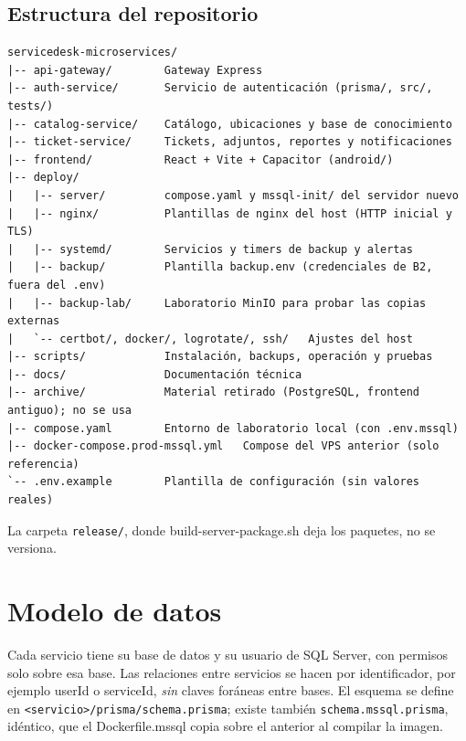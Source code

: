 \documentclass[11pt,a4paper,oneside]{report}
\newcommand{\codus}{\textunderscore\allowbreak}
\DeclareRobustCommand{\cod}[1]{{\small\ttfamily\let\_\codus #1}}
\DeclareRobustCommand{\ruta}[1]{{\small\nolinkurl{#1}}}
\begin{document}
\section{Estructura del repositorio}
\begin{lstlisting}
servicedesk-microservices/
|-- api-gateway/        Gateway Express
|-- auth-service/       Servicio de autenticación (prisma/, src/, tests/)
|-- catalog-service/    Catálogo, ubicaciones y base de conocimiento
|-- ticket-service/     Tickets, adjuntos, reportes y notificaciones
|-- frontend/           React + Vite + Capacitor (android/)
|-- deploy/
|   |-- server/         compose.yaml y mssql-init/ del servidor nuevo
|   |-- nginx/          Plantillas de nginx del host (HTTP inicial y TLS)
|   |-- systemd/        Servicios y timers de backup y alertas
|   |-- backup/         Plantilla backup.env (credenciales de B2, fuera del .env)
|   |-- backup-lab/     Laboratorio MinIO para probar las copias externas
|   `-- certbot/, docker/, logrotate/, ssh/   Ajustes del host
|-- scripts/            Instalación, backups, operación y pruebas
|-- docs/               Documentación técnica
|-- archive/            Material retirado (PostgreSQL, frontend antiguo); no se usa
|-- compose.yaml        Entorno de laboratorio local (con .env.mssql)
|-- docker-compose.prod-mssql.yml   Compose del VPS anterior (solo referencia)
`-- .env.example        Plantilla de configuración (sin valores reales)
\end{lstlisting}
La carpeta \ruta{release/}, donde \cod{build-server-package.sh} deja los paquetes, no se versiona.

\chapter{Modelo de datos}\label{cap:datos}

Cada servicio tiene su base de datos y su usuario de SQL Server, con permisos solo
sobre esa base. Las relaciones entre servicios se hacen por identificador, por ejemplo
\cod{userId} o \cod{serviceId}, \emph{sin} claves foráneas entre bases. El esquema se
define en \ruta{<servicio>/prisma/schema.prisma}; existe también \ruta{schema.mssql.prisma}, idéntico,
que el \cod{Dockerfile.mssql} copia sobre el anterior al compilar la imagen.
\end{document}
